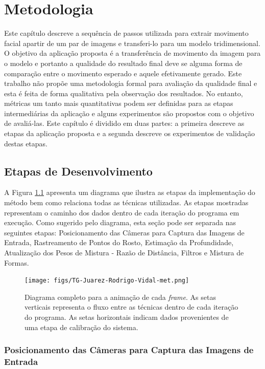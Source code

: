 \chapter{Metodologia}

Este capítulo descreve a sequência de passos utilizada para extrair movimento facial apartir de um par de imagens e transferi-lo para um modelo tridimensional. O objetivo da aplicação proposta é a transferência de movimento da imagem para o modelo e portanto a qualidade do resultado final deve se alguma forma de comparação entre o movimento esperado e aquele efetivamente gerado. Este trabalho não propõe uma metodologia formal para avaliação da qualidade final e esta é feita de forma qualitativa pela observação dos resultados. No entanto, métricas um tanto mais quantitativas podem ser definidas para as etapas intermediárias da aplicação e alguns experimentos são propostos com o objetivo de avaliá-las. Este capítulo é dividido em duas partes: a primeira descreve as etapas da aplicação proposta e a segunda descreve os experimentos de validação destas etapas.

\section{Etapas de Desenvolvimento}

A Figura \ref{fig:metodologia} apresenta um diagrama que ilustra as etapas da implementação do método bem como relaciona todas as técnicas utilizadas. As etapas mostradas representam  o caminho dos dados dentro de cada iteração do programa em execução.  Como sugerido pelo diagrama, esta seção pode ser separada nas seguintes etapas: Posicionamento das Câmeras para Captura das Imagens de Entrada, Rastreamento de Pontos do Rosto, Estimação da Profundidade, Atualização dos Pesos de Mistura - Razão de Distância, Filtros e Mistura de Formas. 

\begin{figure}
\centering
\texttt{[image: figs/TG-Juarez-Rodrigo-Vidal-met.png]}
\caption{Diagrama completo para a animação de cada \textit{frame}. As setas verticais representa o fluxo entre as técnicas dentro de cada iteração do programa. As setas horizontais indicam dados provenientes de uma etapa de calibração do sistema.}
\label{fig:metodologia}
\end{figure}



\subsection{Posicionamento das Câmeras para Captura das Imagens de Entrada}


